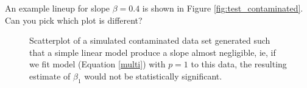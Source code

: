 \documentclass{article}
\begin{document}

An example lineup for slope $\beta=0.4$ is shown in Figure \ref{fig:test_contaminated}.  Can you pick which plot is different? %
\begin{figure}[hbt]
   \centering
       \caption{Scatterplot of a simulated contaminated data set generated such that a simple linear model produce a slope almost negligible, ie, if we fit model (Equation \ref{multi}) with $p=1$  to this data, the resulting estimate of $\beta_1$ would not be statistically significant.
}
       \label{fig:cont_dat}
\end{figure}
\end{document}

